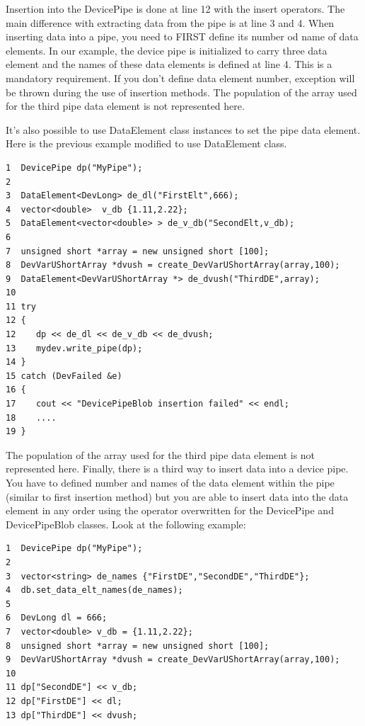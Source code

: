Insertion into the DevicePipe is done at line 12 with the insert operators.
The main difference with extracting data from the pipe is at line
3 and 4. When inserting data into a pipe, you need to FIRST define
its number od name of data elements. In our example, the device pipe
is initialized to carry three data element and the names of these
data elements is defined at line 4. This is a mandatory requirement.
If you don't define data element number, exception will be thrown
during the use of insertion methods. The population of the array used
for the third pipe data element is not represented here.

It's also possible to use DataElement class instances to set the pipe
data element. Here is the previous example modified to use DataElement
class.


\begin{verbatim}
1  DevicePipe dp("MyPipe");
2
3  DataElement<DevLong> de_dl("FirstElt",666);  
4  vector<double>  v_db {1.11,2.22};
5  DataElement<vector<double> > de_v_db("SecondElt,v_db);
6
7  unsigned short *array = new unsigned short [100];
8  DevVarUShortArray *dvush = create_DevVarUShortArray(array,100);
9  DataElement<DevVarUShortArray *> de_dvush("ThirdDE",array);
10
11 try  
12 {     
12    dp << de_dl << de_v_db << de_dvush;
13    mydev.write_pipe(dp);
14 }
15 catch (DevFailed &e)
16 {     
17    cout << "DevicePipeBlob insertion failed" << endl;     
18    ....  
19 }
\end{verbatim}


The population of the array used for the third pipe data element is
not represented here. Finally, there is a third way to insert data
into a device pipe. You have to defined number and names of the data
element within the pipe (similar to first insertion method) but you
are able to insert data into the data element in any order using the
\textquotedbl{}{[}{]}\textquotedbl{} operator overwritten for the
DevicePipe and DevicePipeBlob classes. Look at the following example:


\begin{verbatim}
1  DevicePipe dp("MyPipe");
2 
3  vector<string> de_names {"FirstDE","SecondDE","ThirdDE"};
4  db.set_data_elt_names(de_names);
5
6  DevLong dl = 666;  
7  vector<double> v_db = {1.11,2.22};
8  unsigned short *array = new unsigned short [100];
9  DevVarUShortArray *dvush = create_DevVarUShortArray(array,100);
10
11 dp["SecondDE"] << v_db;
12 dp["FirstDE"] << dl;
13 dp["ThirdDE"] << dvush;
\end{verbatim}


